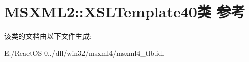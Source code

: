 \hypertarget{class_m_s_x_m_l2_1_1_x_s_l_template40}{}\section{M\+S\+X\+M\+L2\+:\+:X\+S\+L\+Template40类 参考}
\label{class_m_s_x_m_l2_1_1_x_s_l_template40}


该类的文档由以下文件生成\+:\begin{DoxyCompactItemize}
\item 
E\+:/\+React\+O\+S-\/0../dll/win32/msxml4/msxml4\+\_\+tlb.\+idl\end{DoxyCompactItemize}
